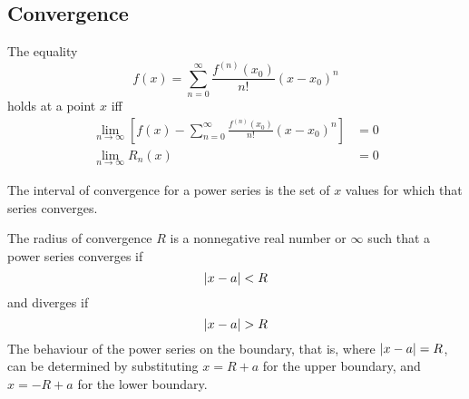 \documentclass{article}
\begin{document}
\subsection{Convergence}
\begin{theorem}
    The equality
    \begin{equation*}
        f(x) = \sum_{n=0}^{\infty} \frac{f^{\left( n \right)}(x_0)}{n!} \left( x-x_0 \right)^n
    \end{equation*}
    holds at a point $x$ iff
    \begin{align*}
        \lim_{n\to\infty} \left[ f(x) - \sum_{n=0}^{\infty} \frac{f^{\left( n \right)}(x_0)}{n!} \left( x-x_0 \right)^n \right] &= 0 \\
        \lim_{n\to\infty} R_n(x) &= 0
    \end{align*}
\end{theorem}
\begin{definition}
    The interval of convergence for a power series is the set of $x$ values for which that series converges.
\end{definition}
\begin{definition}
    The radius of convergence $R$ is a nonnegative real number or $\infty$ such that
    a power series converges if
    \begin{equation*}
        \abs{x - a} < R
    \end{equation*}
    and diverges if
    \begin{equation*}
        \abs{x - a} > R
    \end{equation*}
    The behaviour of the power series on the boundary, that is, where $\abs{x - a} = R$, can be determined by substituting
    $x = R + a$ for the upper boundary, and $x = -R + a$ for the lower boundary.
\end{definition}
\end{document}
